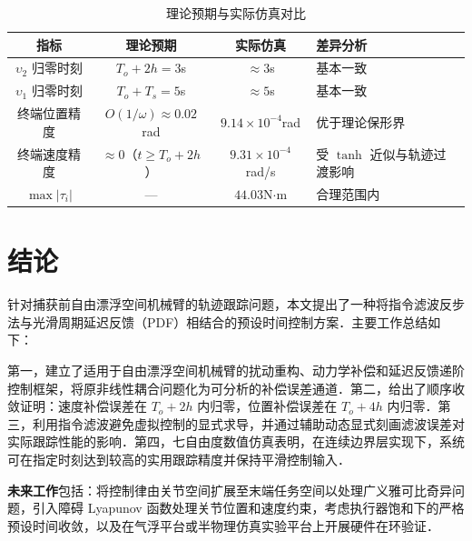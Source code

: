 \documentclass[12pt,a4paper]{article}
\theoremstyle{definition}
\theoremstyle{remark}
\newcommand{\vi}{\upsilon}
\begin{document}
\begin{table}[H]
\centering
\caption{理论预期与实际仿真对比}
\label{tab:compare}
\begin{tabular}{cccl}
\toprule
指标 & 理论预期 & 实际仿真 & 差异分析 \\
\midrule
$\vi_2$ 归零时刻 & $T_o+2h=3$s & $\approx3$s & 基本一致 \\
$\vi_1$ 归零时刻 & $T_o+T_s=5$s & $\approx5$s & 基本一致 \\
终端位置精度 & $O(1/\omega)\approx0.02$rad & $9.14\times10^{-4}$rad & 优于理论保形界 \\
终端速度精度 & $\approx0$（$t\ge T_o+2h$） & $9.31\times10^{-4}$rad/s & 受 $\tanh$ 近似与轨迹过渡影响 \\
$\max|\tau_i|$ & --- & $44.03$N$\cdot$m & 合理范围内 \\
\bottomrule
\end{tabular}
\end{table}


\section{结论}

针对捕获前自由漂浮空间机械臂的轨迹跟踪问题，本文提出了一种将指令滤波反步法与光滑周期延迟反馈（PDF）相结合的预设时间控制方案．主要工作总结如下：

第一，建立了适用于自由漂浮空间机械臂的扰动重构、动力学补偿和延迟反馈递阶控制框架，将原非线性耦合问题化为可分析的补偿误差通道．第二，给出了顺序收敛证明：速度补偿误差在 $T_o+2h$ 内归零，位置补偿误差在 $T_o+4h$ 内归零．第三，利用指令滤波避免虚拟控制的显式求导，并通过辅助动态显式刻画滤波误差对实际跟踪性能的影响．第四，七自由度数值仿真表明，在连续边界层实现下，系统可在指定时刻达到较高的实用跟踪精度并保持平滑控制输入．

\noindent\textbf{未来工作}包括：将控制律由关节空间扩展至末端任务空间以处理广义雅可比奇异问题，引入障碍 Lyapunov 函数处理关节位置和速度约束，考虑执行器饱和下的严格预设时间收敛，以及在气浮平台或半物理仿真实验平台上开展硬件在环验证．



\end{document}
